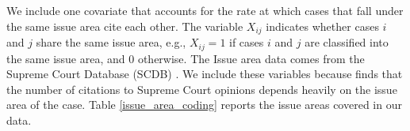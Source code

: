 \documentclass[headsepline=true, abstracton]{scrartcl}
\begin{document}

We include one covariate that accounts for the rate at which cases that fall under the same issue area cite each other. The variable $X_{ij}$ indicates whether cases $i$ and $j$ share the same issue area, e.g., $X_{ij}=1$ if cases $i$ and $j$ are classified into the same issue area, and $0$ otherwise. The Issue area data comes from the Supreme Court Database (SCDB) \citep{spaeth2014supreme}. We include these variables because \citet{cross2010determinants} finds that the number of citations to Supreme Court opinions depends heavily on the issue area of the case. Table \ref{issue_area_coding} reports the issue areas covered in our data.

\end{document}
